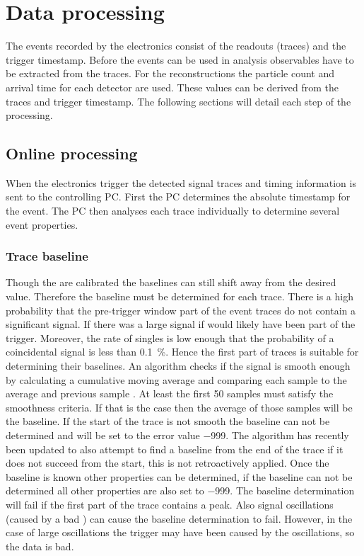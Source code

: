 \chapter{Data processing}
\label{ch:data_processing}

The events recorded by the \hisparc electronics consist of the \pmt readouts (traces) and the trigger timestamp. Before the events can be used in analysis observables have to be extracted from the traces. For the reconstructions the particle count and arrival time for each detector are used. These values can be derived from the traces and trigger timestamp. The following sections will detail each step of the processing.

\section{Online processing}
\label{sec:online}

When the \hisparc electronics trigger the detected signal traces and timing information is sent to the controlling PC. First the PC determines the absolute \gps timestamp for the event. The PC then analyses each trace individually to determine several event properties.


\subsection{Trace baseline}

Though the \adcs are calibrated the baselines can still shift away from the desired value. Therefore the baseline must be determined for each trace. There is a high probability that the pre-trigger window part of the event traces do not contain a significant signal. If there was a large signal if would likely have been part of the trigger. Moreover, the rate of singles is low enough that the probability of a coincidental signal is less than \SI{0.1}{\percent}. Hence the first part of traces is suitable for determining their baselines. An algorithm checks if the signal is smooth enough by calculating a cumulative moving average and comparing each sample to the average and previous sample \cite{oostenbrugge2014daq}. At least the first 50 samples must satisfy the smoothness criteria. If that is the case then the average of those samples will be the baseline. If the start of the trace is not smooth the baseline can not be determined and will be set to the error value \num{-999}. The algorithm has recently been updated to also attempt to find a baseline from the end of the trace if it does not succeed from the start, this is not retroactively applied. Once the baseline is known other properties can be determined, if the baseline can not be determined all other properties are also set to \num{-999}. The baseline determination will fail if the first part of the trace contains a peak. Also signal oscillations (caused by a bad \pmt) can cause the baseline determination to fail. However, in the case of large oscillations the trigger may have been caused by the oscillations, so the data is bad.


